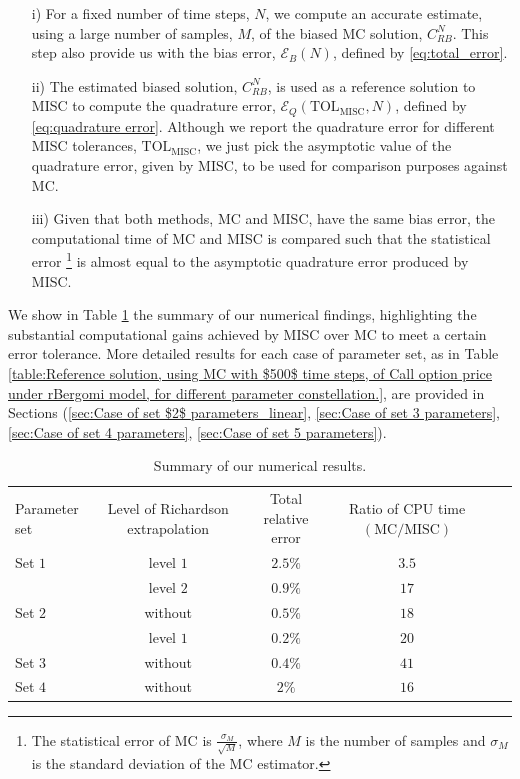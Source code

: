 \begin{enumerate}
\item[i)] For a fixed number of time steps, $N$, we compute an accurate estimate, using a large number of samples, $M$, of the biased  MC solution, $C_{RB}^{N}$. This step also provide us with the bias error, $\mathcal{E}_B(N)$, defined by \eqref{eq:total_error}. 
\item[ii)] The estimated  biased solution,  $C_{RB}^{N}$, is used as a reference solution  to MISC to compute the quadrature error, $\mathcal{E}_Q(\text{TOL}_{\text{MISC}},N)$, defined by \eqref{eq:quadrature error}. Although we report the quadrature error for different MISC tolerances, $\text{TOL}_{\text{MISC}}$, we just pick the asymptotic value of the quadrature error, given by MISC, to be used for comparison purposes against MC.

\item[iii)]  Given that both methods, MC and MISC, have the same bias error,  the computational time of MC and MISC is compared such that the statistical error \footnote{The statistical error of MC is  $\frac{\sigma_M}{\sqrt{M}}$, where $M$ is the number of samples and $\sigma_M$ is the standard deviation of the MC estimator.} is almost equal to the asymptotic quadrature error produced by MISC. 
\end{enumerate}

We show in Table \ref{table:Summary of our numerical results.} the summary of our numerical findings, highlighting the substantial computational gains achieved by MISC over MC to meet a certain error tolerance. More detailed results for each case of parameter set, as in Table \ref{table:Reference solution, using MC with $500$ time steps, of Call option price under rBergomi model, for different parameter constellation.},  are provided in  Sections (\ref{sec:Case of set $2$ parameters_linear}, \ref{sec:Case of set 3 parameters}, \ref{sec:Case of set 4 parameters}, \ref{sec:Case of set 5 parameters}). 



\FloatBarrier
\begin{table}[!h]
	\centering
	\begin{small}
	\begin{tabular}{l*{4}{c}r}
		Parameter set           & Level of Richardson extrapolation    &  Total relative error  & Ratio of CPU time  $\left(\text{MC}/ \text{MISC} \right)$ \\
			Set $1$ & level $1$ &  $2.5\%$&  $3.5$ \\	
              & level $2$ &  $0.9\%$ &  $17$ \\	
              \hline
            Set $2$  & without    &  $0.5\%$&  $18$ \\	
				 & level $1$ &  $0.2\%$&  $20$ \\	
				 \hline
					Set $3$  & without    &  $0.4\%$&  $41$ \\	
					\hline
						Set $4$ & without  &  $2\%$&  $16$ \\	
		\hline
	\end{tabular}
\end{small}
	\caption{Summary of our numerical results.}
	\label{table:Summary of our numerical results.}
\end{table}


